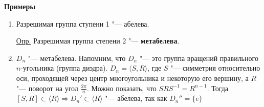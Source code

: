 \documentclass{article}
\begin{document}
\textbf{Примеры}
\begin{enumerate}
	\item Разрешимая группа ступени 1 "--- абелева.
	
	\underline{Опр.} Разрешимая группа степени 2 "--- \textbf{метабелева}.
	
	\item $D_n$ "--- метабелева. Напомним, что $D_n$ "--- это группа вращений правильного $n$-угольника (группа диэдра). $D_n = \langle S, R \rangle$, где $S$ "--- симметрия относительно оси, проходящей через центр многоугольника и некоторую его вершину, а $R$ "--- поворот на угол $\frac{2\pi}{n}$. Можно показать, что $SRS^{-1} = R^{n-1}$. Тогда $[S, R] \subset \langle R \rangle \Rightarrow D_n' \subset \langle R \rangle$ "--- абелева, так как $D_n'' = \{e\}$ 
\end{enumerate}
\end{document}
